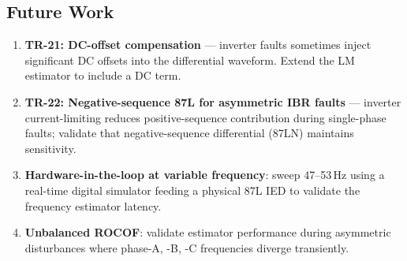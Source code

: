 \documentclass[11pt, a4paper]{article}
\begin{document}
\subsection{Future Work}

\begin{enumerate}
  \item \textbf{TR-21: DC-offset compensation} --- inverter faults sometimes
        inject significant DC offsets into the differential waveform.
        Extend the LM estimator to include a DC term.
  \item \textbf{TR-22: Negative-sequence 87L for asymmetric IBR faults} ---
        inverter current-limiting reduces positive-sequence contribution
        during single-phase faults; validate that negative-sequence
        differential (87LN) maintains sensitivity.
  \item \textbf{Hardware-in-the-loop at variable frequency}: sweep
        47--53\,Hz using a real-time digital simulator feeding a physical
        87L IED to validate the frequency estimator latency.
  \item \textbf{Unbalanced ROCOF}: validate estimator performance during
        asymmetric disturbances where phase-A, -B, -C frequencies diverge
        transiently.
\end{enumerate}




\end{document}
